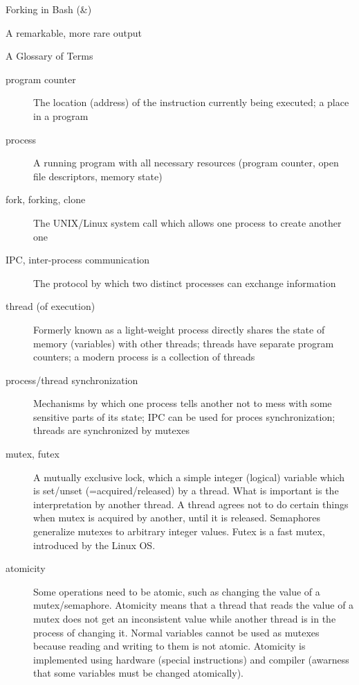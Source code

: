 \documentclass[pdflatex,colorlinks,landscape]{beamer}
\renewcommand\emph[1]{{\color{magenta}#1}}
\begin{document}
\begin{frame}[allowframebreaks]{Forking in Bash (\&)}
  \begin{small}
    
    
  \end{small}
\end{frame}

\begin{frame}{A remarkable, more rare output}
\end{frame}


\begin{frame}[allowframebreaks]{A Glossary of Terms}
  \begin{description}
  \item[program counter] The location (address) of the instruction currently
    being executed; a place in a program
  \item[process] A running program with all necessary resources
    (program counter, open file descriptors, memory state)
  \item[fork, forking, clone] The UNIX/Linux \emph{system call}
    which allows one process to create another one
  \item[IPC, inter-process communication] The protocol by which
    two distinct processes can exchange information
  \item[thread (of execution)] Formerly known as \emph{a light-weight process}
    directly shares the state of memory (variables) with other
    threads; threads have \emph{separate program counters};
    a modern process is a \emph{collection of threads}
  \item[process/thread synchronization] Mechanisms by which
    one process tells another not to mess with some sensitive
    parts of its state; IPC can be used for proces synchronization;
    threads are synchronized by \emph{mutexes}
  \item[mutex, futex] A mutually exclusive lock, which a simple integer
    (logical) variable which is set/unset (=acquired/released) by a
    thread. What is important is the \emph{interpretation} by another
    thread.  A thread agrees not to do certain things when mutex is
    acquired by another, until it is released. \emph{Semaphores} generalize
    mutexes to arbitrary integer values. \emph{Futex} is a \emph{fast mutex},
    introduced by the Linux OS.
  \item[atomicity] Some operations need to be atomic, such as changing
    the value of a mutex/semaphore. Atomicity means that a thread that
    reads the value of a mutex does not get an inconsistent value
    while another thread is {\color{red} in the process of changing it}.
    Normal variables cannot be used as mutexes because reading
    and writing to them {\color{red}is not atomic}. Atomicity is implemented
    using hardware (special instructions) and compiler (awarness that some
    variables must be changed atomically).
  \end{description}
\end{frame}
\end{document}
